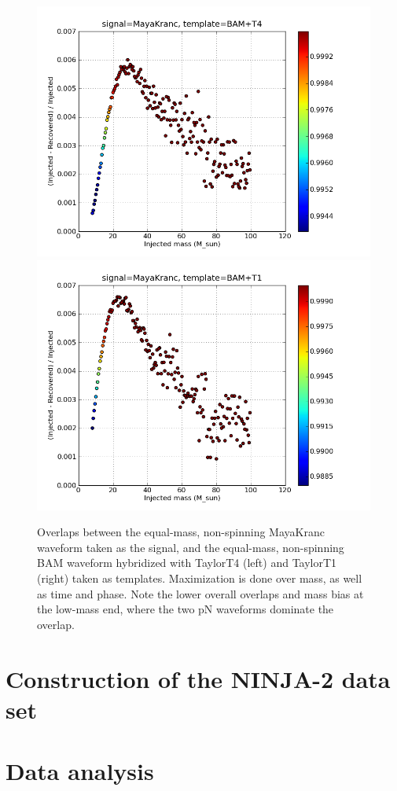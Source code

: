 \begin{figure}
  \includegraphics[width=0.5\linewidth]{figures/ninja2/maya_bamt4_max_over_m}
  \includegraphics[width=0.5\linewidth]{figures/ninja2/maya_bamt1_max_over_m}
  \caption[Overlaps between NINJA-2 submissions maximized over mass]{
  \label{f:ninja2_max_over_mass_bam}
Overlaps between the equal-mass, non-spinning MayaKranc waveform taken
as the signal, and the equal-mass, non-spinning BAM waveform
hybridized with TaylorT4 (left) and TaylorT1 (right) taken as
templates.  Maximization is done over mass, as well as time and phase.
Note the lower overall overlaps and mass bias at the low-mass end,
where the two pN waveforms dominate the overlap.}
\end{figure}%


\section{Construction of the NINJA-2 data set}

\section{Data analysis}


